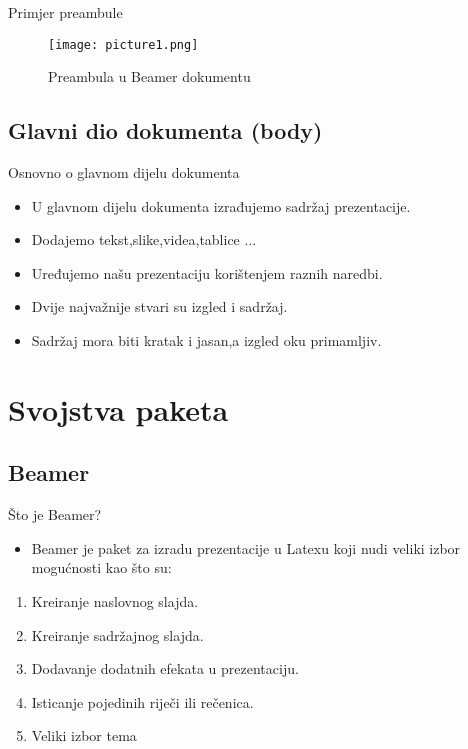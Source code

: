 \documentclass{beamer}
\begin{document}
\begin{frame}{Primjer preambule}
	\begin{figure}[h]
	\texttt{[image: picture1.png]}
	\caption{Preambula u Beamer dokumentu}
	\end{figure}
 \end{frame}

 \subsection{Glavni dio dokumenta (body)}

 \begin{frame}{Osnovno o glavnom dijelu dokumenta}
 	\begin{itemize}
 		\item U glavnom dijelu dokumenta izrađujemo sadržaj prezentacije.
 		\item Dodajemo tekst,slike,videa,tablice ...
 		\item Uređujemo našu prezentaciju korištenjem raznih naredbi.
 		\item Dvije najvažnije stvari su izgled i sadržaj.
 		\item Sadržaj mora biti kratak i jasan,a izgled oku primamljiv.
    \end{itemize}
 \end{frame}

 \section{Svojstva paketa}

 \subsection{Beamer}

 \begin{frame}{Što je Beamer?}
 		\begin{itemize}
 			\item Beamer je paket za izradu prezentacije u Latexu koji nudi veliki izbor mogućnosti kao što su:
 		\end{itemize}
 		\begin{enumerate}
 			\item Kreiranje naslovnog slajda.
 			\item Kreiranje sadržajnog slajda.
 			\item Dodavanje dodatnih efekata u prezentaciju.
 			\item Isticanje pojedinih riječi ili rečenica.
 			\item Veliki izbor tema
 		\end{enumerate}
\end{frame}
\end{document}
